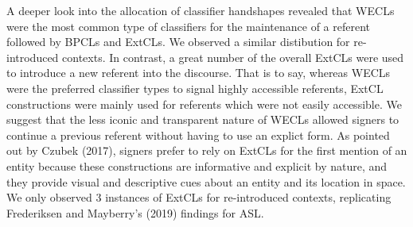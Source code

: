 \documentclass[]{elsarticle} %
\begin{document}
A deeper look into the allocation of classifier handshapes revealed that
WECLs were the most common type of classifiers for the maintenance of a
referent followed by BPCLs and ExtCLs. We observed a similar distibution
for re-introduced contexts. In contrast, a great number of the overall
ExtCLs were used to introduce a new referent into the discourse. That is
to say, whereas WECLs were the preferred classifier types to signal
highly accessible referents, ExtCL constructions were mainly used for
referents which were not easily accessible. We suggest that the less
iconic and transparent nature of WECLs allowed signers to continue a
previous referent without having to use an explict form. As pointed out
by Czubek (2017), signers prefer to rely on ExtCLs for the first mention
of an entity because these constructions are informative and explicit by
nature, and they provide visual and descriptive cues about an entity and
its location in space. We only observed 3 instances of ExtCLs for
re-introduced contexts, replicating Frederiksen and Mayberry's (2019)
findings for ASL.
\end{document}
